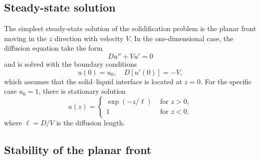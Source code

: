 \documentclass{article}
\begin{document}
\subsection{Steady-state solution}

The simplest steady-state solution of the solidification problem is the planar front
moving in the $z$ direction with velocity $V$.
In the one-dimensional case, the diffusion equation take the form
\begin{equation}\label{eq:problem_1d}
    Du'' + Vu' = 0
\end{equation}
and is solved with the boundary conditions
\begin{equation}\label{eq:bc_1d}
    u(0) = u_0, \quad D[u'(0)] = -V,
\end{equation}
which assumes that the solid--liquid interface is located at $z=0$.
For the specific case $u_0=1$, there is stationary solution
\begin{equation}\label{eq:solution_1d}
    u(z) = \begin{cases}
        \exp(-z/\ell) & \text{ for } z>0, \\
        1 & \text{ for } z<0,
    \end{cases}
\end{equation}
where $\ell=D/V$ is the diffusion length.

\subsection{Stability of the planar front}
\end{document}
